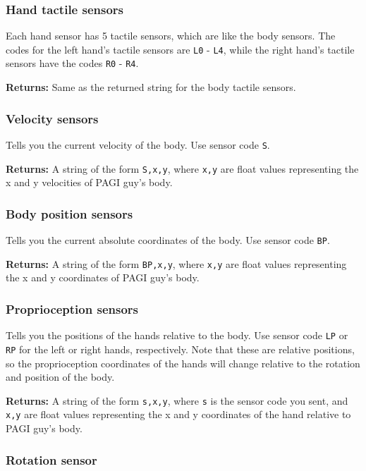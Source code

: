 \subsubsection{Hand tactile sensors}

Each hand sensor has 5 tactile sensors, which are like the body sensors. The codes for the left hand's tactile sensors are \texttt{L0} - \texttt{L4}, while the right hand's tactile sensors have the codes \texttt{R0} - \texttt{R4}.

\noindent \textbf{Returns:} Same as the returned string for the body tactile sensors.

\subsubsection{Velocity sensors}

Tells you the current velocity of the body. Use sensor code \texttt{S}.

\noindent \textbf{Returns:}	 A string of the form \texttt{S,x,y}, where \texttt{x,y} are float values representing the x and y velocities of PAGI guy's body.

\subsubsection{Body position sensors}

Tells you the current absolute coordinates of the body. Use sensor code \texttt{BP}.

\noindent \textbf{Returns:} A string of the form \texttt{BP,x,y}, where \texttt{x,y} are float values representing the x and y coordinates of PAGI guy's body.


\subsubsection{Proprioception sensors}

Tells you the positions of the hands relative to the body. Use sensor code \texttt{LP} or \texttt{RP} for the left or right hands, respectively. Note that these are relative positions, so the proprioception coordinates of the hands will change relative to the rotation and position of the body.

\noindent \textbf{Returns:} A string of the form \texttt{s,x,y}, where \texttt{s} is the sensor code you sent, and \texttt{x,y} are float values representing the x and y coordinates of the hand relative to PAGI guy's body.

\subsubsection{Rotation sensor}

